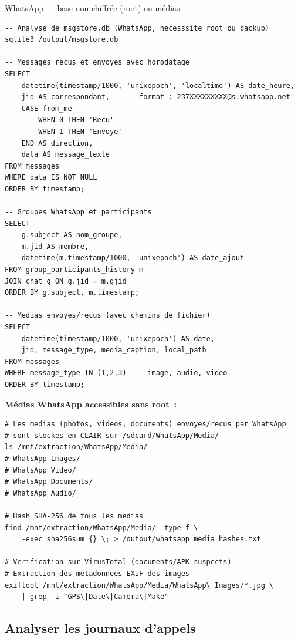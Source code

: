 \begin{boxoutils}{WhatsApp --- base non chiffrée (root) ou médias}
\begin{lstlisting}[language=bash_forensique]
-- Analyse de msgstore.db (WhatsApp, necesssite root ou backup)
sqlite3 /output/msgstore.db

-- Messages recus et envoyes avec horodatage
SELECT
    datetime(timestamp/1000, 'unixepoch', 'localtime') AS date_heure,
    jid AS correspondant,    -- format : 237XXXXXXXXX@s.whatsapp.net
    CASE from_me
        WHEN 0 THEN 'Recu'
        WHEN 1 THEN 'Envoye'
    END AS direction,
    data AS message_texte
FROM messages
WHERE data IS NOT NULL
ORDER BY timestamp;

-- Groupes WhatsApp et participants
SELECT
    g.subject AS nom_groupe,
    m.jid AS membre,
    datetime(m.timestamp/1000, 'unixepoch') AS date_ajout
FROM group_participants_history m
JOIN chat g ON g.jid = m.gjid
ORDER BY g.subject, m.timestamp;

-- Medias envoyes/recus (avec chemins de fichier)
SELECT
    datetime(timestamp/1000, 'unixepoch') AS date,
    jid, message_type, media_caption, local_path
FROM messages
WHERE message_type IN (1,2,3)  -- image, audio, video
ORDER BY timestamp;
\end{lstlisting}

\textbf{Médias WhatsApp accessibles sans root~:}
\begin{lstlisting}[language=bash_forensique]
# Les medias (photos, videos, documents) envoyes/recus par WhatsApp
# sont stockes en CLAIR sur /sdcard/WhatsApp/Media/
ls /mnt/extraction/WhatsApp/Media/
# WhatsApp Images/
# WhatsApp Video/
# WhatsApp Documents/
# WhatsApp Audio/

# Hash SHA-256 de tous les medias
find /mnt/extraction/WhatsApp/Media/ -type f \
    -exec sha256sum {} \; > /output/whatsapp_media_hashes.txt

# Verification sur VirusTotal (documents/APK suspects)
# Extraction des metadonnees EXIF des images
exiftool /mnt/extraction/WhatsApp/Media/WhatsApp\ Images/*.jpg \
    | grep -i "GPS\|Date\|Camera\|Make"
\end{lstlisting}
\end{boxoutils}

\subsection{Analyser les journaux d'appels}

